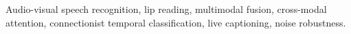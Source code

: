 \begin{abstract}
\end{abstract}

\begin{keywords}
Audio-visual speech recognition, lip reading, multimodal fusion, cross-modal attention,
connectionist temporal classification, live captioning, noise robustness.
\end{keywords}
